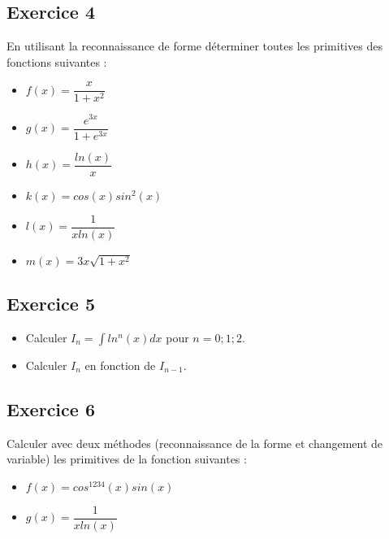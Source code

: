 \documentclass[letterpaper,10pt,french]{sphinxmanual}
\begin{document}
\subsection{Exercice 4}
\label{\detokenize{exo2:exercice-4}}
\sphinxAtStartPar
En utilisant la reconnaissance de forme déterminer toutes les primitives des fonctions suivantes :
\begin{itemize}
\item {} 
\sphinxAtStartPar
\(f(x)=\dfrac{x}{1+x^2}\)

\item {} 
\sphinxAtStartPar
\( g(x) = \dfrac{e^{3x}}{1+e^{3x}}\)

\item {} 
\sphinxAtStartPar
\(h(x) = \dfrac{ln(x)}{x}\)

\item {} 
\sphinxAtStartPar
\(k(x) = cos(x)sin^2(x)\)

\item {} 
\sphinxAtStartPar
\(l(x) = \dfrac{1}{xln(x)}\)

\item {} 
\sphinxAtStartPar
\( m(x) = 3x\sqrt{1+x^2}\)

\end{itemize}


\subsection{Exercice 5}
\label{\detokenize{exo2:exercice-5}}\begin{itemize}
\item {} 
\sphinxAtStartPar
Calculer \(I_n = \int ln^n (x)dx\) pour \(n = 0; 1; 2\).

\item {} 
\sphinxAtStartPar
Calculer \(I_n\) en fonction de \(I_{n-1}\).

\end{itemize}


\subsection{Exercice 6}
\label{\detokenize{exo2:exercice-6}}
\sphinxAtStartPar
Calculer avec deux méthodes (reconnaissance de la forme et changement de variable) les primitives de la fonction suivantes :
\begin{itemize}
\item {} 
\sphinxAtStartPar
\(f(x) = cos^{1234}(x)sin(x)\)

\item {} 
\sphinxAtStartPar
\( g(x) = \dfrac{1}{xln(x)}\)

\end{itemize}
\end{document}
